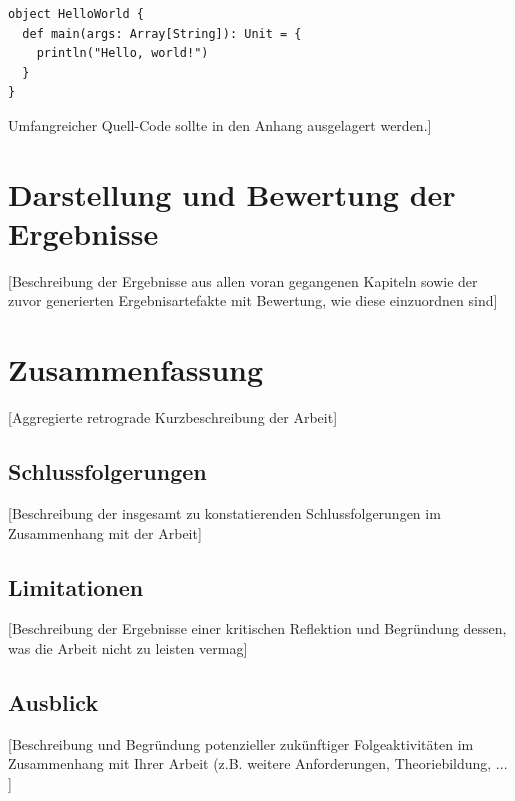 \documentclass[oneside,bibliography=totocnumbered,BCOR=5mm]{scrbook}%
\theoremstyle{definition}
\theoremstyle{definition}
\theoremstyle{definition}
\theoremstyle{definition}
\theoremstyle{definition}
\theoremstyle{definition}
\begin{document}

\begin{lstlisting}[caption={Ein Beispiel: Hello World (Scala)}]
object HelloWorld {
  def main(args: Array[String]): Unit = {
    println("Hello, world!")
  }
}
\end{lstlisting}

Umfangreicher Quell-Code sollte in den Anhang ausgelagert werden.]


\chapter{Darstellung und Bewertung der Ergebnisse}
[Beschreibung der Ergebnisse aus allen voran gegangenen Kapiteln sowie der zuvor generierten Ergebnisartefakte mit Bewertung, wie diese einzuordnen sind]

\chapter{Zusammenfassung}
[Aggregierte retrograde Kurzbeschreibung der Arbeit]
\section{Schlussfolgerungen}
[Beschreibung der insgesamt zu konstatierenden Schlussfolgerungen im Zusammenhang mit der Arbeit]
\section{Limitationen}
[Beschreibung der Ergebnisse einer kritischen Reflektion und Begr\"undung dessen, was die Arbeit nicht zu leisten vermag]
\section{Ausblick}
[Beschreibung und Begr\"undung potenzieller zuk\"unftiger Folgeaktivit\"aten im Zusammenhang mit Ihrer Arbeit (z.B. weitere Anforderungen, Theoriebildung, ... ]
\end{document}
